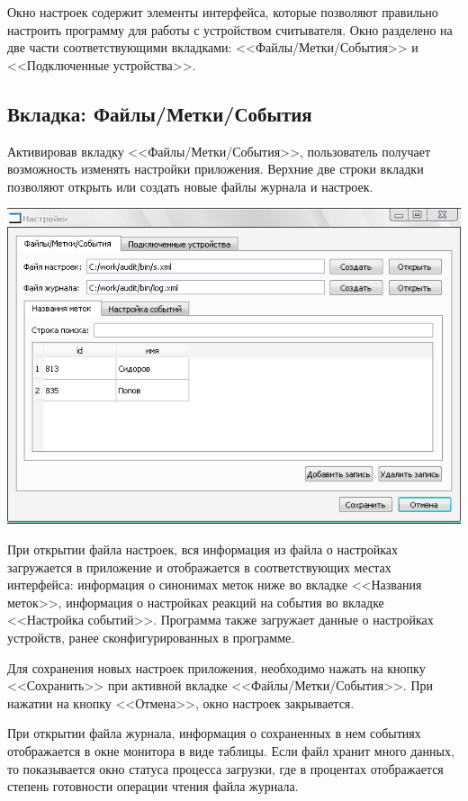 ﻿Окно настроек содержит элементы интерфейса, которые позволяют правильно настроить программу для
работы с устройством считывателя. Окно разделено на две части соответствующими вкладками: <<Файлы/Метки/События>> и
<<Подключенные устройства>>.

\subsection{Вкладка: Файлы/Метки/События}

Активировав вкладку
<<Файлы/Метки/События>>, пользователь получает возможность изменять настройки приложения. Верхние две строки вкладки
позволяют открыть или создать новые файлы журнала и настроек. 

\begin{center}
    \includegraphics[scale=0.5]{img/settings_tag.png}
\end{center}

При открытии файла настроек, вся информация
из файла о настройках загружается в приложение и отображается в соответствующих местах интерфейса: информация о синонимах меток
ниже во вкладке <<Названия меток>>, информация о 
настройках реакций на события во вкладке <<Настройка событий>>. Программа также загружает данные о 
настройках устройств, ранее сконфигурированных в программе.

Для сохранения новых настроек приложения, необходимо нажать на кнопку <<Сохранить>> при активной вкладке
<<Файлы/Метки/События>>. При нажатии на кнопку <<Отмена>>, окно настроек закрывается.

При открытии файла журнала, информация о сохраненных в нем событиях отображается в окне монитора в виде таблицы.
Если файл хранит много данных, то показывается окно статуса процесса загрузки, где в процентах отображается
степень готовности операции чтения файла журнала.  

